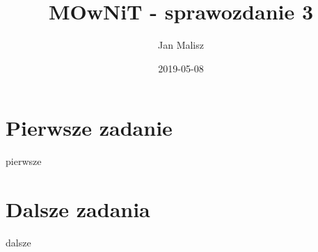 \documentclass[10pt,a4paper]{article}
\title{MOwNiT - sprawozdanie 3}
\author{Jan Malisz}
\date{2019-05-08}
\begin{document}
  \maketitle
  \thispagestyle{empty}

  \newpage
  \section*{Pierwsze zadanie}\label{sec:PierwszeZadanie}
  {pierwsze}

  \newpage
  \section*{Dalsze zadania}\label{sec:DalszeZadania}
  {dalsze}
\end{document}
